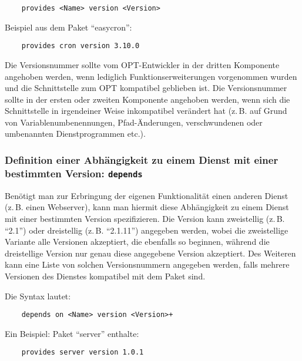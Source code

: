 \begin{example}
\begin{verbatim}
    provides <Name> version <Version>
\end{verbatim}
\end{example}

    Beispiel aus dem Paket "`easycron"':

\begin{example}
\begin{verbatim}
    provides cron version 3.10.0
\end{verbatim}
\end{example}

    Die Versionsnummer sollte vom OPT-Entwickler in der dritten Komponente
    angehoben werden, wenn lediglich Funktionserweiterungen vorgenommen wurden
    und die Schnittstelle zum OPT kompatibel geblieben ist. Die Versionsnummer
    sollte in der ersten oder zweiten Komponente angehoben werden, wenn sich
    die Schnittstelle in irgendeiner Weise inkompatibel verändert hat (z.\,B.
    auf Grund von Variablenumbenennungen, Pfad-Änderungen, verschwundenen oder
    umbenannten Dienstprogrammen etc.).

\subsubsection{Definition einer Abhängigkeit zu einem Dienst mit einer
    bestimmten Version: \texttt{depends}}

    Benötigt man zur Erbringung der eigenen Funktionalität einen anderen
    Dienst (z.\,B. einen Webserver), kann man hiermit diese Abhängigkeit
    zu einem Dienst mit einer bestimmten Version spezifizieren. Die
    Version kann zweistellig (z.\,B. "`2.1"') oder dreistellig (z.\,B. "`2.1.11"')
    angegeben werden, wobei die zweistellige Variante alle Versionen akzeptiert,
    die ebenfalls so beginnen, während die dreistellige Version nur genau
    diese angegebene Version akzeptiert. Des Weiteren kann eine Liste von
    solchen Versionsnummern angegeben werden, falls mehrere Versionen des
    Dienstes kompatibel mit dem Paket sind.

    Die Syntax lautet:

\begin{example}
\begin{verbatim}
    depends on <Name> version <Version>+
\end{verbatim}
\end{example}

    Ein Beispiel: Paket "`server"' enthalte:
\begin{example}
\begin{verbatim}
    provides server version 1.0.1
\end{verbatim}
\end{example}

